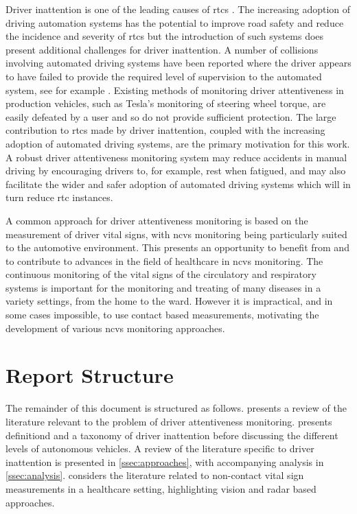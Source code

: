 \documentclass[11pt, parskip=half*,twoside=false]{scrbook}
\begin{document}
Driver inattention is one of the leading causes of \glspl{rtc} \citep{petridouHumanFactorsCausation2000,youngDriverDistraction2007,olsonDriverDistractionCommercial2009}. The increasing adoption of driving automation systems has the potential to improve road safety and reduce the incidence and severity of \glspl{rtc} \citep{favaroExaminingAccidentReports2017} but the introduction of such systems does present additional challenges for driver inattention. A number of collisions involving automated driving systems have been reported where the driver appears to have failed to provide the required level of supervision to the automated system, see for example \citep{ntsbCollisionSportUtility2019,ntsbCollisionCarOperating2019}. Existing methods of monitoring driver attentiveness in production vehicles, such as Tesla's monitoring of steering wheel torque, are easily defeated by a user and so do not provide sufficient protection. The large contribution to \glspl{rtc} made by driver inattention, coupled with the increasing adoption of automated driving systems, are the primary motivation for this work. A robust driver attentiveness monitoring system may reduce accidents in manual driving by encouraging drivers to, for example, rest when fatigued, and may also facilitate the wider and safer adoption of automated driving systems which will in turn reduce \gls{rtc} instances. 

A common approach for driver attentiveness monitoring is based on the measurement of driver vital signs, with \gls{ncvs} monitoring being particularly suited to the automotive environment. This presents an opportunity to benefit from and to contribute to advances in the field of healthcare in \gls{ncvs} monitoring. The continuous monitoring of the vital signs of the circulatory and respiratory systems is important for the monitoring and treating of many diseases in a variety settings, from the home to the ward. However it is impractical, and in some cases impossible, to use contact based measurements, motivating the development of various \gls{ncvs} monitoring approaches. 


\section{Report Structure} \label{sec:struct}
The remainder of this document is structured as follows.  presents a review of the literature relevant to the problem of driver attentiveness monitoring.  presents definitiond and a taxonomy of driver inattention before discussing the different levels of autonomous vehicles. A review of the literature specific to driver inattention is presented in \cref{ssec:approaches}, with accompanying analysis in \cref{ssec:analysis}.   considers the literature related to non-contact vital sign measurements in a healthcare setting, highlighting vision and radar based approaches.  
\end{document}
